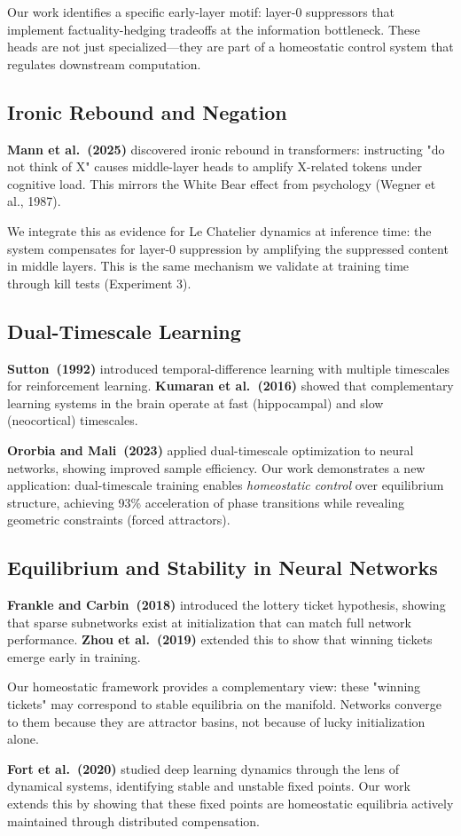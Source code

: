 Our work identifies a specific early-layer motif: layer-0 suppressors that implement factuality-hedging tradeoffs at the information bottleneck. These heads are not just specialized—they are part of a homeostatic control system that regulates downstream computation.

\subsection{Ironic Rebound and Negation}

\textbf{Mann et al.~(2025)} discovered ironic rebound in transformers: instructing "do not think of X" causes middle-layer heads to amplify X-related tokens under cognitive load. This mirrors the White Bear effect from psychology (Wegner et al., 1987).

We integrate this as evidence for Le Chatelier dynamics at inference time: the system compensates for layer-0 suppression by amplifying the suppressed content in middle layers. This is the same mechanism we validate at training time through kill tests (Experiment 3).

\subsection{Dual-Timescale Learning}

\textbf{Sutton~(1992)} introduced temporal-difference learning with multiple timescales for reinforcement learning. \textbf{Kumaran et al.~(2016)} showed that complementary learning systems in the brain operate at fast (hippocampal) and slow (neocortical) timescales.

\textbf{Ororbia and Mali~(2023)} applied dual-timescale optimization to neural networks, showing improved sample efficiency. Our work demonstrates a new application: dual-timescale training enables \emph{homeostatic control} over equilibrium structure, achieving 93\% acceleration of phase transitions while revealing geometric constraints (forced attractors).

\subsection{Equilibrium and Stability in Neural Networks}

\textbf{Frankle and Carbin~(2018)} introduced the lottery ticket hypothesis, showing that sparse subnetworks exist at initialization that can match full network performance. \textbf{Zhou et al.~(2019)} extended this to show that winning tickets emerge early in training.

Our homeostatic framework provides a complementary view: these "winning tickets" may correspond to stable equilibria on the manifold. Networks converge to them because they are attractor basins, not because of lucky initialization alone.

\textbf{Fort et al.~(2020)} studied deep learning dynamics through the lens of dynamical systems, identifying stable and unstable fixed points. Our work extends this by showing that these fixed points are homeostatic equilibria actively maintained through distributed compensation.
